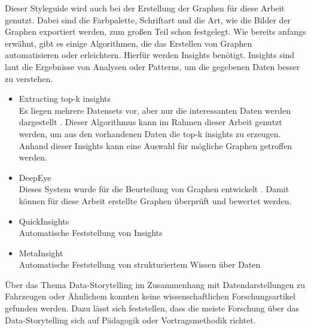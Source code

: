 Dieser Styleguide wird auch bei der Erstellung der Graphen für diese Arbeit genutzt. Dabei sind die Farbpalette, Schriftart und die Art, wie die Bilder der Graphen exportiert werden, zum großen Teil schon festgelegt.
Wie bereits anfangs erwähnt, gibt es einige Algorithmen, die das Erstellen von Graphen automatisieren oder erleichtern. Hierfür werden Insights benötigt. Insights sind laut \cite{HewlettPackardEnterpriseDevelopmentLP.2023} die Ergebnisse von Analysen oder Patterns, um die gegebenen Daten besser zu verstehen.
\begin{itemize}
    \item Extracting top-k insights\hfill\\  Es liegen mehrere Datensets vor, aber nur die \glqq interessanten\grqq{} Daten werden dargestellt \cite{Tang.2017}. Dieser Algorithmus kann im Rahmen dieser Arbeit genutzt werden, um aus den vorhandenen Daten die \glqq top-k insights\grqq{} zu erzeugen. Anhand dieser Insights kann eine Auswahl für mögliche Graphen getroffen werden.\\
    \item DeepEye\hfill\\ Dieses System wurde für die Beurteilung von Graphen entwickelt \cite{Luo.2018}. Damit können für diese Arbeit erstellte Graphen überprüft und bewertet werden.\\
    \item QuickInsights\hfill\\ Automatische Feststellung von Insights\\
    \item MetaInsight\hfill\\ Automatische Feststellung von strukturiertem Wissen über Daten\\
\end{itemize}
Über das Thema Data-Storytelling im Zusammenhang mit Datendarstellungen zu Fahrzeugen oder Ähnlichem konnten keine wissenschaftlichen Forschungsartikel gefunden werden. Dazu lässt sich feststellen, dass die meiste Forschung über das Data-Storytelling sich auf Pädagogik oder Vortragsmethodik richtet.
